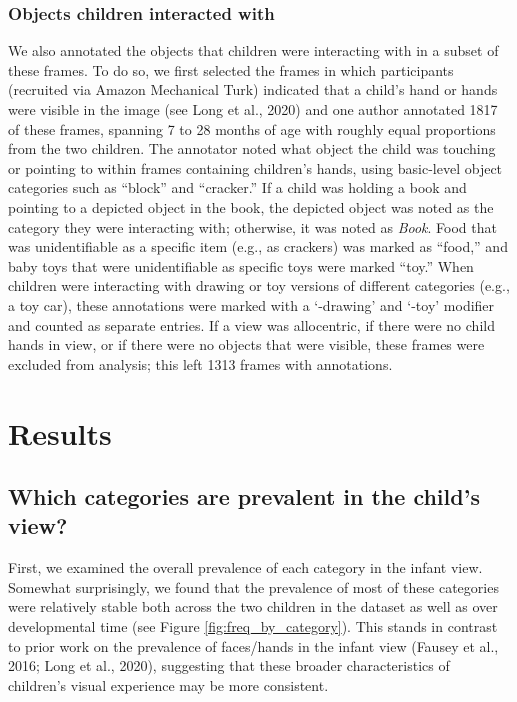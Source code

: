 \documentclass[10pt, letterpaper]{article}
\begin{document}
\hypertarget{objects-children-interacted-with}{%
\subsubsection{Objects children interacted
with}\label{objects-children-interacted-with}}

We also annotated the objects that children were interacting with in a
subset of these frames. To do so, we first selected the frames in which
participants (recruited via Amazon Mechanical Turk) indicated that a
child's hand or hands were visible in the image (see Long et al., 2020)
and one author annotated 1817 of these frames, spanning 7 to 28 months
of age with roughly equal proportions from the two children. The
annotator noted what object the child was touching or pointing to within
frames containing children's hands, using basic-level object categories
such as ``block'' and ``cracker.'' If a child was holding a book and
pointing to a depicted object in the book, the depicted object was noted
as the category they were interacting with; otherwise, it was noted as
\emph{Book}. Food that was unidentifiable as a specific item (e.g., as
crackers) was marked as ``food,'' and baby toys that were unidentifiable
as specific toys were marked ``toy.'' When children were interacting
with drawing or toy versions of different categories (e.g., a toy car),
these annotations were marked with a `-drawing' and `-toy' modifier and
counted as separate entries. If a view was allocentric, if there were no
child hands in view, or if there were no objects that were visible,
these frames were excluded from analysis; this left 1313 frames with
annotations.

\hypertarget{results}{%
\section{Results}\label{results}}

\hypertarget{which-categories-are-prevalent-in-the-childs-view}{%
\subsection{Which categories are prevalent in the child's
view?}\label{which-categories-are-prevalent-in-the-childs-view}}

First, we examined the overall prevalence of each category in the infant
view. Somewhat surprisingly, we found that the prevalence of most of
these categories were relatively stable both across the two children in
the dataset as well as over developmental time (see Figure
\ref{fig:freq_by_category}). This stands in contrast to prior work on
the prevalence of faces/hands in the infant view (Fausey et al., 2016;
Long et al., 2020), suggesting that these broader characteristics of
children's visual experience may be more consistent.
\end{document}
